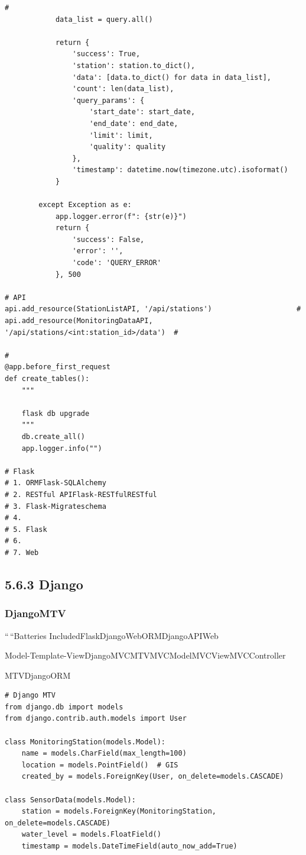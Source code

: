 \begin{lstlisting}[style=python]
            # 
            data_list = query.all()
            
            return {
                'success': True,
                'station': station.to_dict(),
                'data': [data.to_dict() for data in data_list],
                'count': len(data_list),
                'query_params': {
                    'start_date': start_date,
                    'end_date': end_date,
                    'limit': limit,
                    'quality': quality
                },
                'timestamp': datetime.now(timezone.utc).isoformat()
            }
            
        except Exception as e:
            app.logger.error(f": {str(e)}")
            return {
                'success': False,
                'error': '',
                'code': 'QUERY_ERROR'
            }, 500

# API
api.add_resource(StationListAPI, '/api/stations')                    # 
api.add_resource(MonitoringDataAPI, '/api/stations/<int:station_id>/data')  # 

# 
@app.before_first_request
def create_tables():
    """
    
    flask db upgrade
    """
    db.create_all()
    app.logger.info("")

# Flask
# 1. ORMFlask-SQLAlchemy
# 2. RESTful APIFlask-RESTfulRESTful
# 3. Flask-Migrateschema
# 4. 
# 5. Flask
# 6. 
# 7. Web
\end{lstlisting}

\hypertarget{django}{%
\subsection{5.6.3 Django}\label{django}}

\hypertarget{djangomtv}{%
\subsubsection{DjangoMTV}\label{djangomtv}}

``\,``Batteries
IncludedFlaskDjangoWebORMDjango\important{}\important{}\important{}\important{}API\important{}Web

Model-Template-ViewDjangoMVCMTVMVCModelMVCViewMVCController

MTVDjangoORM

\begin{lstlisting}[style=python]
# Django MTV
from django.db import models
from django.contrib.auth.models import User

class MonitoringStation(models.Model):
    name = models.CharField(max_length=100)
    location = models.PointField()  # GIS
    created_by = models.ForeignKey(User, on_delete=models.CASCADE)
    
class SensorData(models.Model):
    station = models.ForeignKey(MonitoringStation, on_delete=models.CASCADE)
    water_level = models.FloatField()
    timestamp = models.DateTimeField(auto_now_add=True)
\end{lstlisting}

